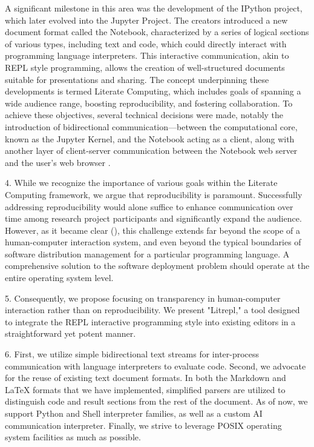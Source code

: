 \documentclass[a4paper,12pt,twocolumn]{article}
\begin{document}
A significant milestone in this area was the development of the IPython project,
which later evolved into the Jupyter Project. The creators introduced a new
document format called the Notebook, characterized by a series of logical
sections of various types, including text and code, which could directly
interact with programming language interpreters. This interactive communication,
akin to REPL style programming, allows the creation of well-structured documents
suitable for presentations and sharing. The concept underpinning these
developments is termed Literate Computing, which includes goals of spanning a
wide audience range, boosting reproducibility, and fostering collaboration. To
achieve these objectives, several technical decisions were made, notably the
introduction of bidirectional communication—between the computational core,
known as the Jupyter Kernel, and the Notebook acting as a client, along with
another layer of client-server communication between the Notebook web server and
the user’s web browser \cite{Perez2007IPython, Granger2021litcomp,
Kluyver2016jupnb}.

4. While we recognize the importance of various goals within the Literate
Computing framework, we argue that reproducibility is paramount. Successfully
addressing reproducibility would alone suffice to enhance communication over
time among research project participants and significantly expand the audience.
However, as it became clear (\cite{Dolstra2010, Vallet2022}), this challenge
extends far beyond the scope of a human-computer interaction system, and even
beyond the typical boundaries of software distribution management for a
particular programming language. A comprehensive solution to the software
deployment problem should operate at the entire operating system level.


5. Consequently, we propose focusing on transparency in human-computer
interaction rather than on reproducibility. We present "Litrepl," a tool
designed to integrate the REPL interactive programming style into existing
editors in a straightforward yet potent manner.

6. First, we utilize simple bidirectional text streams for inter-process
communication with language interpreters to evaluate code. Second, we advocate
for the reuse of existing text document formats. In both the Markdown and LaTeX
formats that we have implemented, simplified parsers are utilized to distinguish
code and result sections from the rest of the document. As of now, we support
Python and Shell interpreter families, as well as a custom AI communication
interpreter. Finally, we strive to leverage POSIX \cite{POSIX2024} operating
system facilities as much as possible.
\end{document}
